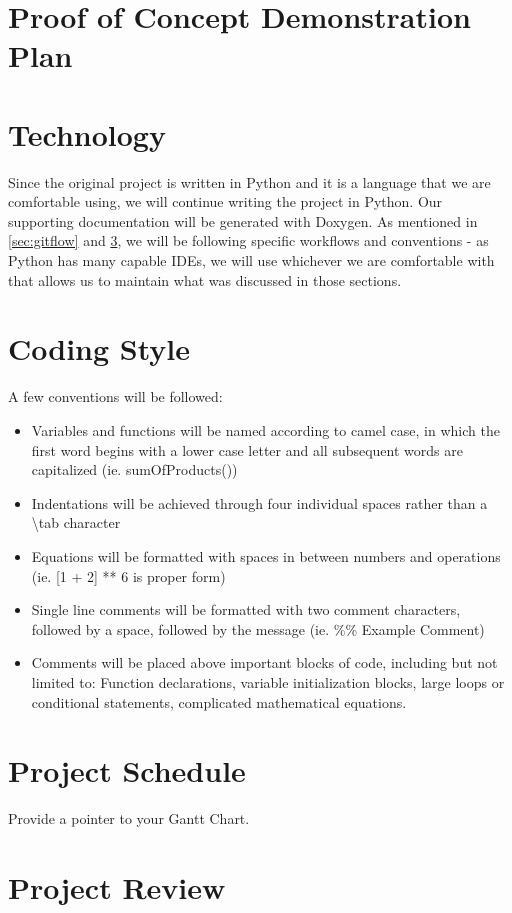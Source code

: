 \documentclass{article}
\begin{document}
\section{Proof of Concept Demonstration Plan}

\section{Technology}
Since the original project is written in Python and it is a language that we are comfortable using, we will continue writing the project in Python. Our supporting documentation will be generated with Doxygen. As mentioned in \ref{sec:gitflow} and \ref{sec:style}, we will be following specific workflows and conventions - as Python has many capable IDEs, we will use whichever we are comfortable with that allows us to maintain what was discussed in those sections. 
\section{Coding Style} \label{sec:style}
A few conventions will be followed:
\begin{itemize}
  \item Variables and functions will be named according to camel case, in which the first word begins with a lower case letter and all subsequent words are capitalized (ie. sumOfProducts())
  \item Indentations will be achieved through four individual spaces rather than a \textbackslash tab character
  \item Equations will be formatted with spaces in between numbers and operations (ie. [1 + 2] ** 6 is proper form)
  \item Single line comments will be formatted with two comment characters, followed by a space, followed by the message (ie. \%\% Example Comment)
  \item Comments will be placed above important blocks of code, including but not limited to: Function declarations, variable initialization blocks, large loops or conditional statements, complicated mathematical equations. 
\end{itemize}
\section{Project Schedule}

Provide a pointer to your Gantt Chart.

\section{Project Review}
\end{document}
